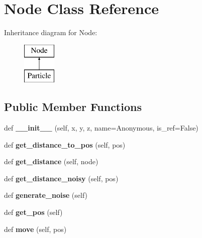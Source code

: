 \hypertarget{class_emulator_1_1_node}{}\section{Node Class Reference}
\label{class_emulator_1_1_node}
Inheritance diagram for Node\+:\begin{figure}[H]
\begin{center}
\leavevmode
\includegraphics[height=2.000000cm]{class_emulator_1_1_node}
\end{center}
\end{figure}
\subsection*{Public Member Functions}
\begin{DoxyCompactItemize}
\item 
\mbox{\label{class_emulator_1_1_node_ac43dc993c13bff5b6c6b607b6029b627}} 
def {\bfseries \+\_\+\+\_\+init\+\_\+\+\_\+} (self, x, y, z, name=\textquotesingle{}Anonymous\textquotesingle{}, is\+\_\+ref=False)
\item 
\mbox{\label{class_emulator_1_1_node_a4c8b8381ab3d5ec726c1ac0a605b0cc1}} 
def {\bfseries get\+\_\+distance\+\_\+to\+\_\+pos} (self, pos)
\item 
\mbox{\label{class_emulator_1_1_node_a029192a087701ed05b647b566687054e}} 
def {\bfseries get\+\_\+distance} (self, node)
\item 
\mbox{\label{class_emulator_1_1_node_ac1c282ef457c86e57f059d889fd109a6}} 
def {\bfseries get\+\_\+distance\+\_\+noisy} (self, pos)
\item 
\mbox{\label{class_emulator_1_1_node_ac678816339dde4c5fd312b183fbef3c7}} 
def {\bfseries generate\+\_\+noise} (self)
\item 
\mbox{\label{class_emulator_1_1_node_a914802152a6586315fd4e22dd7131f88}} 
def {\bfseries get\+\_\+pos} (self)
\item 
\mbox{\label{class_emulator_1_1_node_af452979cc7ef897f3f022c542979fd3a}} 
def {\bfseries move} (self, pos)
\end{DoxyCompactItemize}
